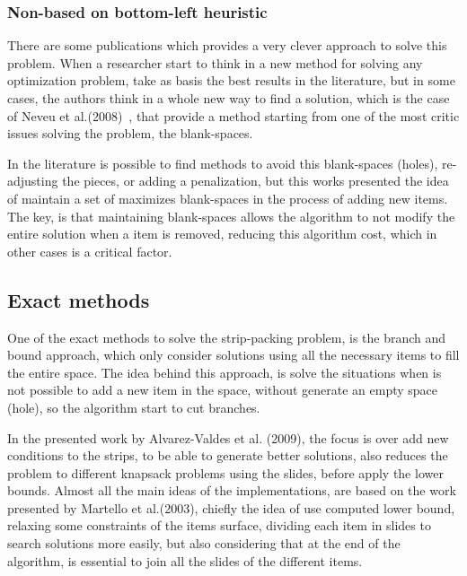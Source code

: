 \subsubsection{Non-based on bottom-left heuristic}

There are some publications which provides a very clever
approach to solve this problem.
When a researcher start to think in a new method for
solving any optimization problem, take as basis
the best results in the literature,
but in some cases, the authors think in a whole new way
to find a solution, which is the case of Neveu et al.(2008)~\cite{neveu},
that provide a method starting from one of the most critic
issues solving the problem, the blank-spaces.

In the literature is possible to find methods to avoid
this blank-spaces (holes), re-adjusting the pieces,
or adding a penalization, but this works presented the
idea of maintain a set of maximizes blank-spaces in the
process of adding new items.
The key, is that maintaining blank-spaces allows the
algorithm to not modify the entire solution when a item
is removed, reducing this algorithm cost,
which in other cases is a critical factor.



\subsection{Exact methods}

One of the exact methods to solve the strip-packing problem,
is the branch and bound approach,
which only consider solutions using all the necessary items
to fill the entire space.
The idea behind this approach, is solve the situations when
is not possible to add a new item in the space,
without generate an empty space (hole),
so the algorithm start to cut branches.

In the presented work by Alvarez-Valdes et al. (2009)\cite{alvarez},
the focus is over add new conditions to the strips,
to be able to generate better solutions,
also reduces the problem to different knapsack problems using the slides,
before apply the lower bounds.
Almost all the main ideas of the implementations,
are based on the work presented by Martello et al.(2003)\cite{martello},
chiefly the idea of use computed lower bound,
relaxing some constraints of the items surface,
dividing each item in slides to search solutions
more easily, but also considering that at the end of the algorithm,
is essential to join all the slides of the different items.


% 
